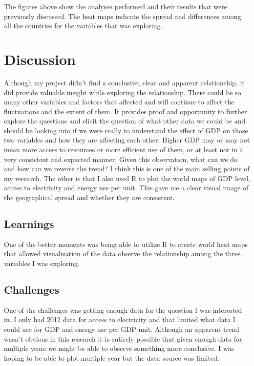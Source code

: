 \documentclass{article}
\begin{document}
The figures above show the analyses performed and their results that were previously discussed. The heat maps indicate the spread and differences among all the countries for the variables that was exploring. 


\section{Discussion}

Although my project didn’t find a conclusive, clear and apparent relationship, it did provide valuable insight while exploring the relationship. There could be so many other variables and factors that affected and will continue to affect the fluctuations and the extent of them. It provides proof and opportunity to further explore the questions and elicit the question of what other data we could be and should be looking into if we were really to understand the effect of GDP on those two variables and how they are affecting each other. Higher GDP may or may not mean more access to resources or more efficient use of them, or at least not in a very consistent and expected manner. Given this observation, what can we do and how can we reverse the trend? I think this is one of the main selling points of my research. The other is that I also used R to plot the world maps of GDP level, access to electricity and energy use per unit. This gave me a clear visual image of the geographical spread and whether they are consistent.

\subsection{Learnings}

One of the better moments was being able to utilize R to create world heat maps that allowed visualization of the data observe the relationship among the three variables I was exploring. 

\subsection{Challenges}

One of the challenges was getting enough data for the question I was interested in. I only had 2012 data for access to electricity and that limited what data I could use for GDP and energy use per GDP unit. Although an apparent trend wasn’t obvious in this research it is entirely possible that given enough data for multiple years we might be able to observe something more conclusive. I was hoping to be able to plot multiple year but the data source was limited. 
\end{document}
